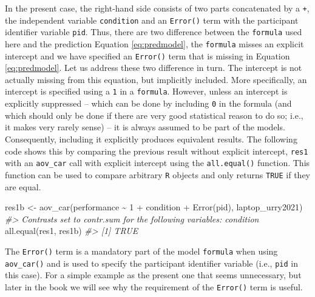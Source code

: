 \documentclass[
]{book}
\newenvironment{Shaded}{\begin{snugshade}}{\end{snugshade}}
\newcommand{\CommentTok}[1]{\textcolor[rgb]{0.56,0.35,0.01}{\textit{#1}}}
\newcommand{\DecValTok}[1]{\textcolor[rgb]{0.00,0.00,0.81}{#1}}
\newcommand{\FunctionTok}[1]{\textcolor[rgb]{0.00,0.00,0.00}{#1}}
\newcommand{\NormalTok}[1]{#1}
\newcommand{\OtherTok}[1]{\textcolor[rgb]{0.56,0.35,0.01}{#1}}
\newcommand{\SpecialCharTok}[1]{\textcolor[rgb]{0.00,0.00,0.00}{#1}}
\begin{document}
In the present case, the right-hand side consists of two parts concatenated by a \texttt{+}, the independent variable \texttt{condition} and an \texttt{Error()} term with the participant identifier variable \texttt{pid}. Thus, there are two difference between the \texttt{formula} used here and the prediction Equation \eqref{eq:predmodel}, the \texttt{formula} misses an explicit intercept and we have specified an \texttt{Error()} term that is missing in Equation \eqref{eq:predmodel}. Let us address these two difference in turn. The intercept is not actually missing from this equation, but implicitly included. More specifically, an intercept is specified using a \texttt{1} in a \texttt{formula}. However, unless an intercept is explicitly suppressed -- which can be done by including \texttt{0} in the formula (and which should only be done if there are very good statistical reason to do so; i.e., it makes very rarely sense) -- it is always assumed to be part of the models. Consequently, including it explicitly produces equivalent results. The following code shows this by comparing the previous result without explicit intercept, \texttt{res1} with an \texttt{aov\_car} call with explicit intercept using the \texttt{all.equal()} function. This function can be used to compare arbitrary \texttt{R} objects and only returns \texttt{TRUE} if they are equal.

\begin{Shaded}
\begin{Highlighting}[]
\NormalTok{res1b }\OtherTok{\textless{}{-}} \FunctionTok{aov\_car}\NormalTok{(performance }\SpecialCharTok{\textasciitilde{}} \DecValTok{1} \SpecialCharTok{+}\NormalTok{ condition }\SpecialCharTok{+} \FunctionTok{Error}\NormalTok{(pid), laptop\_urry2021)}
\CommentTok{\#\textgreater{} Contrasts set to contr.sum for the following variables: condition}
\FunctionTok{all.equal}\NormalTok{(res1, res1b)}
\CommentTok{\#\textgreater{} [1] TRUE}
\end{Highlighting}
\end{Shaded}

The \texttt{Error()} term is a mandatory part of the model \texttt{formula} when using \texttt{aov\_car()} and is used to specify the participant identifier variable (i.e., \texttt{pid} in this case). For a simple example as the present one that seems unnecessary, but later in the book we will see why the requirement of the \texttt{Error()} term is useful.
\end{document}
